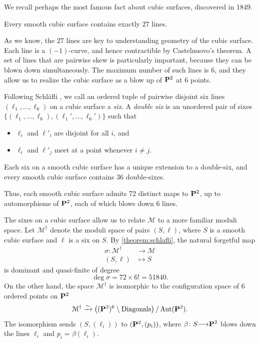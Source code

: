 \documentclass[11pt,reqno, letterpaper]{amsart}
\renewcommand{\to}{{\longrightarrow}}
\numberwithin{equation}{section}
\begin{document}
We recall perhaps the most famous fact about cubic surfaces, discovered in 1849. 
\begin{theorem}
  \label{theorem:cayleysalmon}
  Every smooth cubic surface contains exactly $27$ lines.
\end{theorem}
As we know, the 27 lines are key to understanding geometry of the
cubic surface.  Each line is a $(-1)$-curve, and hence contractible by
Castelnuovo's theorem.  A set of lines that are pairwise skew is
particularly important, because they can be blown down simultaneously.
The maximum number of such lines is 6, and they allow us to realize
the cubic surface as a blow up of $\P^2$ at 6 points.

Following Schl\"afli \cite{sch:58}, we call an ordered tuple of pairwise disjoint six lines $(\ell_1, \dots, \ell_6)$ on a cubic surface a \emph{six}.
A \emph{double six} is an unordered pair of sixes $\{(\ell_1, \dots, \ell_6), (\ell_1', \dots, \ell_6')\}$ such that
\begin{itemize}
\item $\ell_{i}$ and $\ell'_{i}$ are disjoint for all $i$, and
\item $\ell_{i}$ and $\ell'_{j}$ meet at a point whenever $i \neq j$.
\end{itemize}

\begin{theorem}
  \label{theorem:schlafli} Each six on a smooth cubic surface has a unique extension to a double-six, and every smooth cubic surface contains $36$ double-sixes.
\end{theorem}
Thus, each smooth cubic surface admits 72 distinct maps to
$\P^2$, up to automorphisms of $\P^2$, each of which
blows down 6 lines.

The sixes on a cubic surface allow us to relate $\mathcal M$ to a more
familiar moduli space.  Let $\mathcal M^\dagger$ denote the moduli
space of pairs $(S, \ell)$, where $S$ is a smooth cubic surface and
$\ell$ is a six on $S$.  By \autoref{theorem:schlafli}, the natural
forgetful map
\begin{align*}
  \sigma \colon \mathcal M^\dagger &\to \mathcal M \\
  (S, \ell) &\mapsto S
\end{align*}
is dominant and quasi-finite of degree
\[ \deg \sigma = 72 \times 6! = 51840.\] On the other hand, the space
$\mathcal M^\dagger$ is isomorphic to the configuration space of 6
ordered points on $\P^2$
\[ \mathcal M^\dagger \xrightarrow{\sim} \left( (\P^2)^6 \setminus
    \text{Diagonals} \right) / \Aut(\P^2).\] The isomorphism sends
$(S, (\ell_i))$ to $(\P^2, (p_i))$, where $\beta \colon S \to \P^2$
blows down the lines $\ell_i$ and $p_i = \beta(\ell_i)$.
\end{document}
